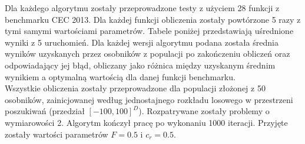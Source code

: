 \documentclass[a4paper,12pt]{article}
\theoremstyle{definition}
\begin{document}
Dla każdego algorytmu zostały przeprowadzone testy z użyciem 28 funkcji z benchmarku CEC 2013. Dla każdej funkcji obliczenia zostały powtórzone 5 razy z tymi samymi wartościami parametrów. Tabele poniżej przedstawiają uśrednione wyniki z 5 uruchomień. Dla każdej wersji algorytmu podana została średnia wyników uzyskanych przez osobników z populacji po zakończeniu obliczeń oraz odpowiadający jej błąd, obliczany jako różnica między uzyskanym średnim wynikiem a optymalną wartością dla danej funkcji benchmarku.\\

Wszystkie obliczenia zostały przeprowadzone dla populacji złożonej z 50 osobników, zainicjowanej według jednostajnego rozkładu losowego w przestrzeni poszukiwań (przedział $[-100,100]^D$). Rozpatrywane zostały problemy o wymiarowości 2. Algorytm kończył pracę po wykonaniu 1000 iteracji. Przyjęte zostały wartości parametrów $F = 0.5$ i $c_r = 0.5$.
\end{document}
